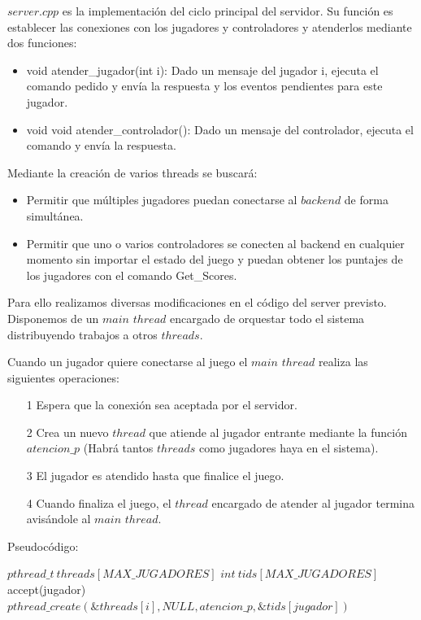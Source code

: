 $server.cpp$ es la implementación del ciclo principal del servidor. Su función es establecer las conexiones con los jugadores y controladores y atenderlos mediante dos funciones:

\begin{itemize}
	\item void atender\_jugador(int i): Dado un mensaje del jugador i, ejecuta el comando pedido y envía la respuesta y los eventos pendientes para este jugador.
	\item void void atender\_controlador(): Dado un mensaje del controlador, ejecuta el comando y envía la respuesta.
\end{itemize}

Mediante la creación de varios threads se buscará:

\begin{itemize}
	\item Permitir que múltiples jugadores puedan conectarse al $backend$ de forma simultánea.
	\item Permitir que uno o varios controladores se conecten al backend en cualquier momento sin importar el estado del juego y puedan obtener los puntajes de los jugadores con el comando Get\_Scores.
\end{itemize}

Para ello realizamos diversas modificaciones en el código del server previsto. Disponemos de un $main$ $thread$ encargado de orquestar todo el sistema distribuyendo trabajos a otros $threads$.

Cuando un jugador quiere conectarse al juego el $main$ $thread$ realiza las siguientes operaciones:

\begin{itemize}
	\item[1] Espera que la conexión sea aceptada por el servidor.
	\item[2] Crea un nuevo $thread$ que atiende al jugador entrante mediante la función $atencion\_p$ (Habrá tantos $threads$ como jugadores haya en el sistema).
	\item[3] El jugador es atendido hasta que finalice el juego.
	\item[4] Cuando finaliza el juego, el $thread$ encargado de atender al jugador termina avisándole al $main$ $thread$.
\end{itemize}

Pseudocódigo:

\begin{algorithmic}
	\State $pthread\_t \ threads[MAX\_JUGADORES]$ 
	\State $int \ tids[MAX\_JUGADORES]$
		\State accept(jugador)
		\State $pthread\_create(\&threads[i],NULL,atencion\_p,\&tids[jugador])$
	\EndFor
  \EndFunction
\end{algorithmic}

